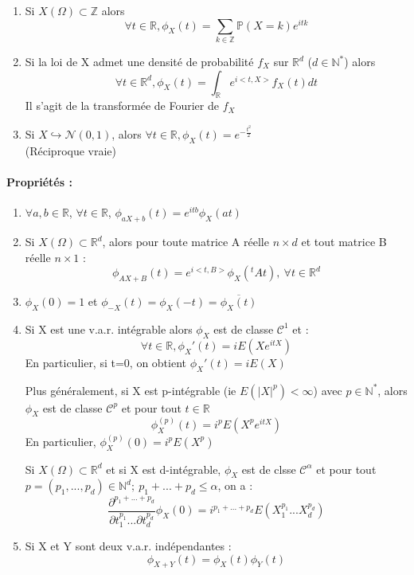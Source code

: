 \begin{rmq}
\begin{enumerate}
	\item Si $X(\Omega)\subset \mathbb{Z}$ alors \[ \forall t\in \mathbb{R}, \phi_X(t)=\sum_{k\in\mathbb{Z}}\mathbb{P}(X=k)e^{itk}\]
	\item Si la loi de X admet une densité de probabilité $f_X$ sur $\mathbb{R}^d$ ($d\in\mathbb{N}^*$) alors 
\[\forall t\in \mathbb{R}^d, \phi_X(t) =\int_{\mathbb{R}} e^{i<t,X>} f_X(t) dt\]
Il s'agit de la transformée de Fourier de $f_X$
\item Si $X\hookrightarrow \mathcal{N}(0,1)$, alors $\forall t\in \mathbb{R}, \phi_X(t)=e^{-\frac{t^2}{2}}$ \\
(Réciproque vraie)
\end{enumerate}
\end{rmq}

\paragraph{Propriétés : \\}
\begin{enumerate}
\item $\forall a,b \in \mathbb{R}$, $\forall t \in \mathbb{R}$, $\phi_{aX+b}(t)=e^{itb}\phi_X(at)$
\item Si $X(\Omega) \subset \mathbb{R}^d$, alors pour toute matrice A réelle $n\times d$ et tout matrice B réelle $n\times 1$ : 
\[\phi_{AX+B}(t)=e^{i<t,B>}\phi_X(^tAt),\ \forall t\in \mathbb{R}^d\]
\item $\phi_X(0)=1$ et $\phi_{-X}(t)=\phi_X(-t)=\overline{\phi_X(t)}$
\item Si X est une v.a.r. intégrable alors $\phi_X$ est de classe $\mathcal{C}^1$ et : 
\[\forall t\in \mathbb{R}, \phi_X '(t)=iE(Xe^{itX})\]
En particulier, si t=0, on obtient $\phi_X '(t)=iE(X)$

\bigskip
Plus généralement, si X est p-intégrable (ie $E(|X|^p)<\infty$) avec $p\in \mathbb{N}^*$, alors $\phi_X$ est de classe $\mathcal{C}^p$ et pour tout $t\in \mathbb{R}$ 
\[\phi_X^{(p)} (t)=i^p E(X^p e^{itX})\]
En particulier, $\phi_X^{(p)}(0)=i^p E(X^p)$ 

\bigskip
Si $X(\Omega)\subset \mathbb{R}^d$ et si X est d-intégrable, $\phi_X$ est de clsse $\mathcal{C}^{\alpha}$ et pour tout $p=(p_1,...,p_d) \in \mathbb{N}^d;\ p_1+...+p_d\leq \alpha$, on a :
\[\frac{\partial^{p_1+...+p_d}}{\partial t_1^{p_1}...\partial t_d^{p_d}}\phi_X(0)=i^{p_1+...+p_d} E(X_1^{p_1}...X_d^{p_d})\]

\item Si X et Y sont deux v.a.r. indépendantes : \[\phi_{X+Y}(t) = \phi_X(t)\phi_Y(t)\]
\end{enumerate}

